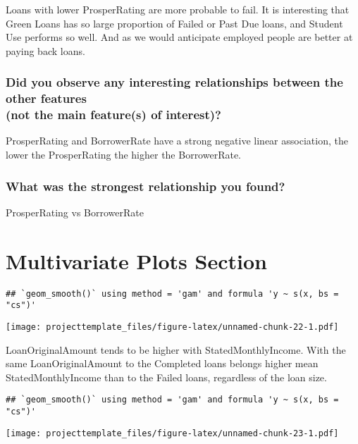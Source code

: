 \documentclass[]{article}
\begin{document}
Loans with lower ProsperRating are more probable to fail. It is
interesting that Green Loans has so large proportion of Failed or Past
Due loans, and Student Use performs so well. And as we would anticipate
employed people are better at paying back loans.

\subsubsection{\texorpdfstring{Did you observe any interesting
relationships between the other features\\
(not the main feature(s) of
interest)?}{Did you observe any interesting relationships between the other features (not the main feature(s) of interest)?}}\label{did-you-observe-any-interesting-relationships-between-the-other-features-not-the-main-features-of-interest}

ProsperRating and BorrowerRate have a strong negative linear
association, the lower the ProsperRating the higher the BorrowerRate.

\subsubsection{What was the strongest relationship you
found?}\label{what-was-the-strongest-relationship-you-found}

ProsperRating vs BorrowerRate

\section{Multivariate Plots Section}\label{multivariate-plots-section}

\begin{verbatim}
## `geom_smooth()` using method = 'gam' and formula 'y ~ s(x, bs = "cs")'
\end{verbatim}

\texttt{[image: projecttemplate\_files/figure-latex/unnamed-chunk-22-1.pdf]}

LoanOriginalAmount tends to be higher with StatedMonthlyIncome. With the
same LoanOriginalAmount to the Completed loans belongs higher mean
StatedMonthlyIncome than to the Failed loans, regardless of the loan
size.

\begin{verbatim}
## `geom_smooth()` using method = 'gam' and formula 'y ~ s(x, bs = "cs")'
\end{verbatim}

\texttt{[image: projecttemplate\_files/figure-latex/unnamed-chunk-23-1.pdf]}
\end{document}
